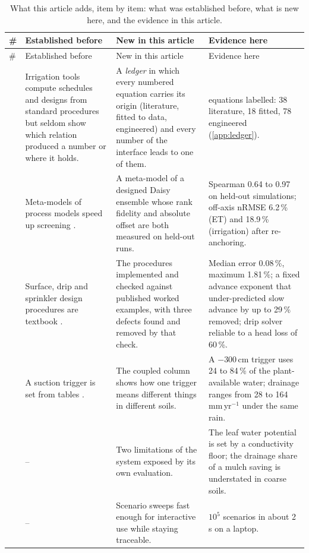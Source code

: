 {\small\setlength{\tabcolsep}{4pt}
\begin{longtable}{@{}>{\raggedright\arraybackslash}p{0.4cm}>{\raggedright\arraybackslash}p{4.5cm}>{\raggedright\arraybackslash}p{5.4cm}>{\raggedright\arraybackslash}p{5.0cm}@{}}
\caption{What this article adds, item by item: what was established before, what is new here, and the evidence in this article.}\label{tab:novelty}\\
\toprule
\# & Established before & New in this article & Evidence here\\\midrule\endfirsthead
\toprule \# & Established before & New in this article & Evidence here\\\midrule\endhead
1 & Irrigation tools compute schedules and designs from standard procedures \citep{Allen1998,Steduto2009,Simunek2016} but seldom show which relation produced a number or where it holds. & A \emph{ledger} in which every numbered equation carries its origin (literature, fitted to data, engineered) and every number of the interface leads to one of them. & 134 equations labelled: 38 literature, 18 fitted, 78 engineered (\cref{app:ledger}).\\
2 & Meta-models of process models speed up screening \citep{Razavi2012,Asher2015}. & A meta-model of a designed Daisy ensemble whose rank fidelity and absolute offset are both measured on held-out runs. & Spearman 0.64 to 0.97 on held-out simulations; off-axis nRMSE 6.2\,\% (ET) and 18.9\,\% (irrigation) after re-anchoring.\\
3 & Surface, drip and sprinkler design procedures are textbook \citep{Walker1987,KellerKarmeli1974,Christiansen1942}. & The procedures implemented and checked against published worked examples, with three defects found and removed by that check. & Median error 0.08\,\%, maximum 1.81\,\%; a fixed advance exponent that under-predicted slow advance by up to 29\,\% removed; drip solver reliable to a head loss of 60\,\%.\\
4 & A suction trigger is set from tables \citep{Allen1998}. & The coupled column shows how one trigger means different things in different soils. & A $-300$\,cm trigger uses 24 to 84\,\% of the plant-available water; drainage ranges from 28 to 164\,mm\,yr$^{-1}$ under the same rain.\\
5 & -- & Two limitations of the system exposed by its own evaluation. & The leaf water potential is set by a conductivity floor; the drainage share of a mulch saving is understated in coarse soils.\\
6 & -- & Scenario sweeps fast enough for interactive use while staying traceable. & $10^5$ scenarios in about 2\,s on a laptop.\\
\bottomrule
\end{longtable}}
